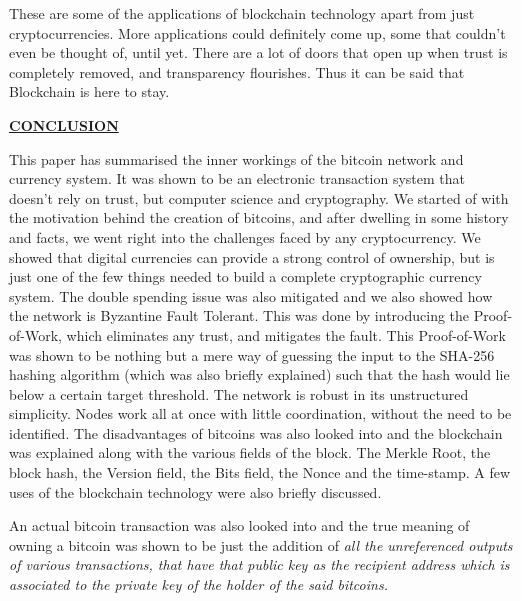 \documentclass[12pt,a4paper]{report}
\begin{document}
\begin{justify}
\vspace{10mm}
These are some of the applications of blockchain technology apart from just cryptocurrencies. More applications could definitely come up, some that couldn't even be thought of, until yet. There are a lot of doors that open up when trust is completely removed, and transparency flourishes. Thus it can be said that Blockchain is here to stay.

\newpage
\begin{center}\underline{ \Large \textbf{CONCLUSION}}\end{center}
\vspace{10mm}
This paper has summarised the inner workings of the bitcoin network and currency system. It was shown to be an electronic transaction system that doesn't rely on  trust, but computer science and cryptography. We started of with the motivation behind the creation of bitcoins, and after dwelling in some history and facts, we went right into the challenges faced by any cryptocurrency.\newline
We showed that digital currencies can provide a strong control of ownership, but is just one of the few things needed to build a complete cryptographic currency system.
The double spending issue was also mitigated and we also showed how the network is Byzantine Fault Tolerant. This was done by introducing the Proof-of-Work, which eliminates any trust, and mitigates the fault.\newline
This Proof-of-Work was shown to be nothing but a mere way of guessing the input to the SHA-256 hashing algorithm (which was also briefly explained) such that the hash would lie below a certain target threshold.
The network is robust in its unstructured simplicity. Nodes work all at once with little coordination, without the need to be identified.\newline
The disadvantages of bitcoins was also looked into and the blockchain was explained along with the various fields of the block. The Merkle Root, the block hash, the Version field, the Bits field, the Nonce and the time-stamp. A few uses of the blockchain technology were also briefly discussed.\newline

An actual bitcoin transaction was also looked into and the true meaning of owning a bitcoin was shown to be just the addition of \textit{all the unreferenced outputs of various transactions,  that have that public key as the recipient address which is associated to the private key of the holder of the said bitcoins.}\newline


\end{justify}
\end{document}
